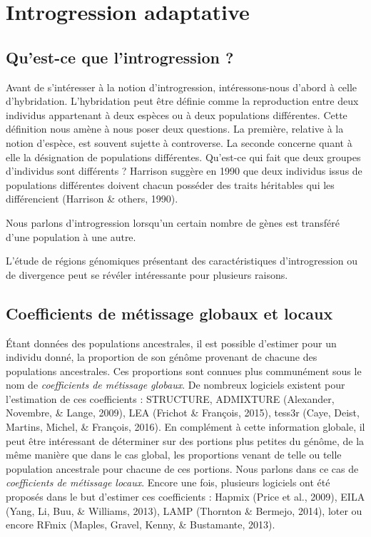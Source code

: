 \documentclass[12pt,a4paper,twoside]{ugathesis}
\theoremstyle{definition}
\theoremstyle{definition}
\theoremstyle{remark}
\begin{document}
\newpage



\newpage

\chapter{Introgression adaptative}\label{introgression-adaptative}

\section{Qu'est-ce que l'introgression
?}\label{quest-ce-que-lintrogression}

Avant de s'intéresser à la notion d'introgression, intéressons-nous
d'abord à celle d'hybridation. L'hybridation peut être définie comme la
reproduction entre deux individus appartenant à deux espèces ou à deux
populations différentes. Cette définition nous amène à nous poser deux
questions. La première, relative à la notion d'espèce, est souvent
sujette à controverse. La seconde concerne quant à elle la désignation
de populations différentes. Qu'est-ce qui fait que deux groupes
d'individus sont différents ? Harrison suggère en 1990 que deux
individus issus de populations différentes doivent chacun posséder des
traits héritables qui les différencient (Harrison \& others, 1990).

Nous parlons d'introgression lorsqu'un certain nombre de gènes est
transféré d'une population à une autre.

L'étude de régions génomiques présentant des caractéristiques
d'introgression ou de divergence peut se révéler intéressante pour
plusieurs raisons.

\section{Coefficients de métissage globaux et
locaux}\label{coefficients-de-metissage-globaux-et-locaux}

Étant données des populations ancestrales, il est possible d'estimer
pour un individu donné, la proportion de son génôme provenant de chacune
des populations ancestrales. Ces proportions sont connues plus
communément sous le nom de \emph{coefficients de métissage globaux}. De
nombreux logiciels existent pour l'estimation de ces coefficients :
STRUCTURE, ADMIXTURE (Alexander, Novembre, \& Lange, 2009), LEA (Frichot
\& François, 2015), tess3r (Caye, Deist, Martins, Michel, \& François,
2016). En complément à cette information globale, il peut être
intéressant de déterminer sur des portions plus petites du génôme, de la
même manière que dans le cas global, les proportions venant de telle ou
telle population ancestrale pour chacune de ces portions. Nous parlons
dans ce cas de \emph{coefficients de métissage locaux}. Encore une fois,
plusieurs logiciels ont été proposés dans le but d'estimer ces
coefficients : Hapmix (Price et al., 2009), EILA (Yang, Li, Buu, \&
Williams, 2013), LAMP (Thornton \& Bermejo, 2014), loter ou encore RFmix
(Maples, Gravel, Kenny, \& Bustamante, 2013).
\end{document}
